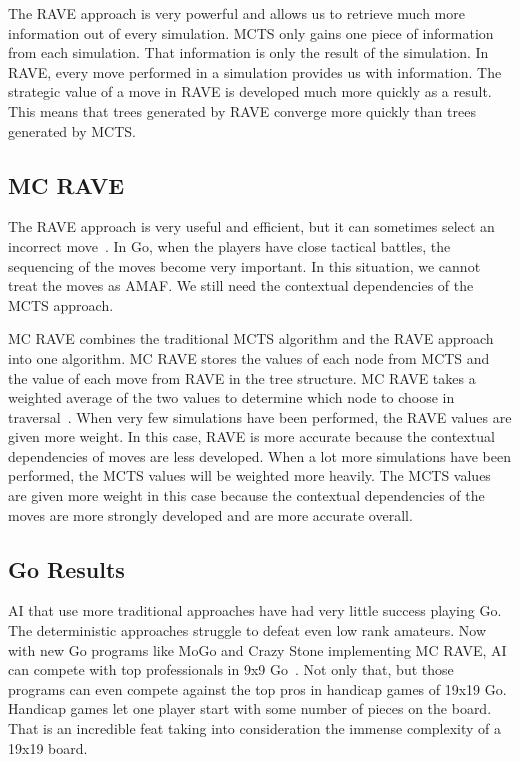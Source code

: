 \documentclass{sig-alternate}
\begin{document}
The RAVE approach is very powerful and allows us to retrieve much more information out of every simulation. MCTS only gains one piece of information from each simulation. That information is only the result of the simulation. In RAVE, every move performed in a simulation provides us with information. The strategic value of a move in RAVE is developed much more quickly as a result. This means that trees generated by RAVE converge more quickly than trees generated by MCTS.

\subsection{MC RAVE}
The RAVE approach is very useful and efficient, but it can sometimes select an incorrect move~\cite{RAVEinGo}. In Go, when the players have close tactical battles, the sequencing of the moves become very important. In this situation, we cannot treat the moves as AMAF. We still need the contextual dependencies of the MCTS approach.

MC RAVE combines the traditional MCTS algorithm and the RAVE approach into one algorithm. MC RAVE stores the values of each node from MCTS and the value of each move from RAVE in the tree structure. MC RAVE takes a weighted average of the two values to determine which node to choose in traversal~\cite{RAVEinGo}. When very few simulations have been performed, the RAVE values are given more weight. In this case, RAVE is more accurate because the contextual dependencies of moves are less developed. When a lot more simulations have been performed, the MCTS values will be weighted more heavily. The MCTS values are given more weight in this case because the contextual dependencies of the moves are more strongly developed and are more accurate overall.
\subsection{Go Results}
AI that use more traditional approaches have had very little success playing Go. The deterministic approaches struggle to defeat even low rank amateurs. Now with new Go programs like MoGo and Crazy Stone implementing MC RAVE, AI can compete with top professionals in 9x9 Go~\cite{RAVEinGo}. Not only that, but those programs can even compete against the top pros in handicap games of 19x19 Go. Handicap games let one player start with some number of pieces on the board. That is an incredible feat taking into consideration the immense complexity of a 19x19 board.
\end{document}
